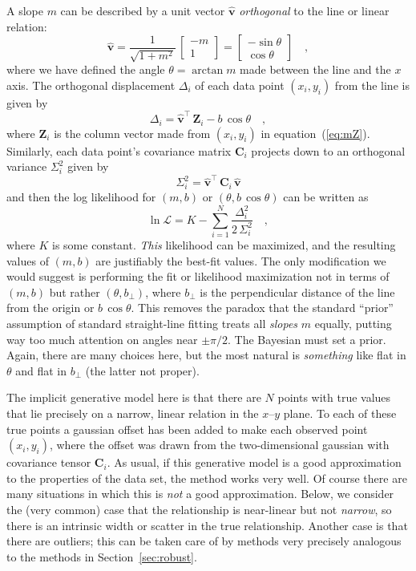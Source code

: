 \documentclass[12pt]{article}
\newcommand{\sectionname}{Section}
\newcommand{\equationname}{equation}
\newcommand{\mmatrix}[1]{\boldsymbol{#1}}
\newcommand{\transpose}[1]{{#1}^{\scriptscriptstyle \top}}
\newcommand{\mC}{\mmatrix{C}}
\newcommand{\mZ}{\mmatrix{Z}}
\newcommand{\vhat}{\mmatrix{\hat{v}}}
\newcommand{\like}{\mathscr{L}}
\newcommand{\bperp}{b_{\perp}}
\begin{document}
A slope $m$ can be described by a unit vector $\vhat$
\emph{orthogonal} to the line or linear relation:
\begin{equation}
\vhat
 = \frac{1}{\sqrt{1+m^2}}\,\left[\begin{array}{c}-m\\1\end{array}\right]
 = \left[\begin{array}{c}-\sin\theta\\\cos\theta\end{array}\right] \quad ,
\end{equation}
where we have defined the angle $\theta = \arctan m$ made between the
line and the $x$ axis.  The orthogonal displacement $\Delta_i$ of each
data point $(x_i,y_i)$ from the line is given by
\begin{equation}
\Delta_i = \transpose{\vhat}\,\mZ_i - b\,\cos\theta \quad ,
\end{equation}
where $\mZ_i$ is the column vector made from $(x_i,y_i)$ in
\equationname~(\ref{eq:mZ}).  Similarly, each data point's covariance
matrix $\mC_i$ projects down to an orthogonal variance $\Sigma_i^2$ given by
\begin{equation}\label{eq:Sigma}
\Sigma_i^2 = \transpose{\vhat}\,\mC_i\,\vhat
\end{equation}
and then the log likelihood for $(m,b)$ or $(\theta,b\,\cos\theta)$
can be written as
\begin{equation}\label{eq:twodlike}
\ln\like = K - \sum_{i=1}^N \frac{\Delta_i^2}{2\,\Sigma_{i}^2} \quad ,
\end{equation}
where $K$ is some constant.  \emph{This} likelihood can be maximized,
and the resulting values of $(m,b)$ are justifiably the best-fit
values.  The only modification we would suggest is performing the fit
or likelihood maximization not in terms of $(m,b)$ but rather
$(\theta,\bperp)$, where $\bperp$ is the perpendicular distance of the
line from the origin or $b\,\cos\theta$.  This removes the paradox
that the standard ``prior'' assumption of standard straight-line
fitting treats all \emph{slopes} $m$ equally, putting way too much
attention on angles near $\pm\pi/2$.  The Bayesian must set a prior.
Again, there are many choices here, but the most natural is
\emph{something} like flat in $\theta$ and flat in $\bperp$ (the
latter not proper).

The implicit generative model here is that there are $N$ points with
true values that lie precisely on a narrow, linear relation in the
$x$--$y$ plane.  To each of these true points a gaussian offset has
been added to make each observed point $(x_i,y_i)$, where the offset
was drawn from the two-dimensional gaussian with covariance tensor
$\mC_i$.  As usual, if this generative model is a good approximation
to the properties of the data set, the method works very well.  Of
course there are many situations in which this is \emph{not} a good
approximation.  Below, we consider the (very common) case that the
relationship is near-linear but not \emph{narrow}, so there is an
intrinsic width or scatter in the true relationship.  Another case is
that there are outliers; this can be taken care of by methods very
precisely analogous to the methods in \sectionname~\ref{sec:robust}.
\end{document}
